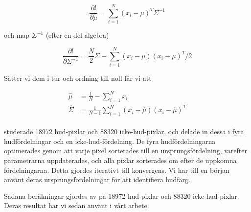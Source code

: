 \documentclass[../rapport_MVEX01-11-05]{subfiles}
\begin{document}
\begin{equation}
\frac{\partial l}{\partial \mu}=\sum_{i=1}^N(x_i-\mu)^T\Sigma^{-1}
\end{equation}

och map $\Sigma^{-1}$ (efter en del algebra)

\begin{equation}
\frac{\partial l}{\partial \Sigma^{-1}}=\frac{N}{2}\Sigma -\sum_{i=1}^N(x_i-\mu)(x_i-\mu)^T/2
\end{equation}

Sätter vi dem i tur och ordning till noll får vi att

\begin{align}
\hat\mu&=\frac{1}{N}-\sum_{i=1}^Nx_i\\
\hat\Sigma&=\frac{1}{N-1}\sum_{i=1}^N(x_i-\hat\mu)(x_i-\hat\mu)^T\\
\end{align}

 studerade 18972
hud-pixlar och 88320 icke-hud-pixlar, och delade in dessa i fyra
hudfördelningar och en icke-hud-fördelning. De fyra hudfördelningarna
optimerades genom att varje pixel sorterades till en
ursprungsfördelning, varefter parametrarna uppdaterades, och alla
pixlar sorterades om efter de uppkomna fördelningarna. Detta gjordes
iterativt till konvergens. Vi har till en början använt deras
ursprungsfördelningar för att identifiera hudfärg.

Sådana beräkningar gjordes av  på 18972
hud-pixlar och 88320 icke-hud-pixlar. Deras resultat har vi sedan
använt i vårt arbete.


\end{document}
